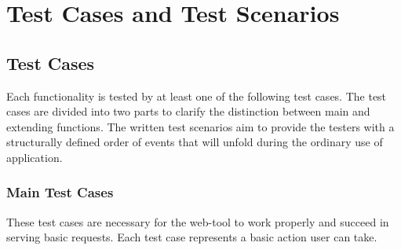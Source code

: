 \section{Test Cases and Test Scenarios}
\subsection{Test Cases}
Each functionality is tested by at least one of the following test cases. The test cases are divided into two parts to clarify the distinction between main and extending functions. The written test scenarios aim to provide the testers with a structurally defined order of events that will unfold during the ordinary use of application. 
\subsubsection{Main Test Cases}
These test cases are necessary for the web-tool to work properly and succeed in serving
basic requests. Each test case represents a basic action user can take.

